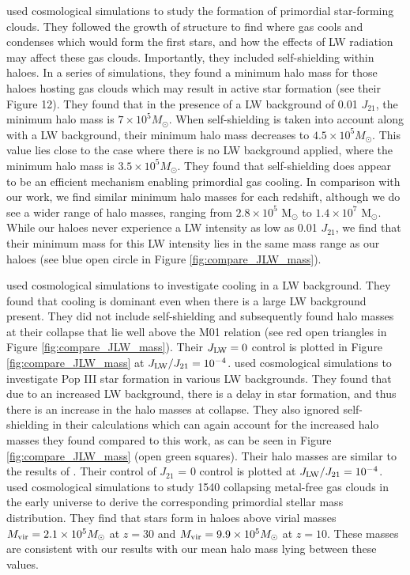 \documentclass[fleqn,usenatbib]{mnras}
\begin{document}
\citet{Yoshida03} used cosmological simulations to study the formation of primordial star-forming clouds. They followed the growth of structure to find where gas cools and condenses which would form the first stars, and how the effects of LW radiation may affect these gas clouds. Importantly, they included \hh{} self-shielding within haloes. In a series of simulations, they found a minimum halo mass for those haloes hosting gas clouds which may result in active star formation (see their Figure 12). They found that in the presence of a LW background of 0.01 $J_{21}$, the minimum halo mass is $7 \times 10^{5} M_{\odot}$. When \hh{} self-shielding is taken into account along with a LW background, their minimum halo mass decreases to $4.5 \times 10^{5} M_{\odot}$. This value lies close to the case where there is no LW background applied, where the minimum halo mass is $3.5 \times 10^{5} M_{\odot}$. They found that \hh{} self-shielding does appear to be an efficient mechanism enabling primordial gas cooling. In comparison with our work, we find similar minimum halo masses for each redshift, although we do see a wider range of halo masses, ranging from $2.8 \times 10^{5}$ M$_{\odot}$ to $1.4 \times 10^{7}$ M$_{\odot}$. While our haloes never experience a LW intensity as low as 0.01 $J_{21}$, we find that their minimum mass for this LW intensity lies in the same mass range as our haloes (see blue open circle in Figure \ref{fig:compare_JLW_mass}). 

\citet{Wise07_UVB} used cosmological simulations to investigate \hh{} cooling in a LW background. They found that \hh{} cooling is dominant even when there is a large LW background present. They did not include self-shielding and subsequently found halo masses at their collapse that lie well above the M01 relation (see red open triangles in Figure \ref{fig:compare_JLW_mass}). Their $J_{\rm LW} = 0$ control is plotted in Figure \ref{fig:compare_JLW_mass} at $J_{\rm LW}/J_{21} = 10^{-4}$. \citet{OShea08} used cosmological simulations to investigate Pop III star formation in various LW backgrounds. They found that due to an increased LW background, there is a delay in star formation, and thus there is an increase in the halo masses at collapse. They also ignored \hh{} self-shielding in their calculations which can again account for the increased halo masses they found compared to this work, as can be seen in Figure \ref{fig:compare_JLW_mass} (open green squares). Their halo masses are similar to the results of \citet{Wise07_UVB}. Their control of $J_{21}$ = 0 control is plotted at $J_{\rm LW}/J_{21} = 10^{-4}$. \citet{Hirano15} used cosmological simulations to study 1540 collapsing metal-free gas clouds in the early universe to derive the corresponding primordial stellar mass distribution. They find that stars form in haloes above virial masses $M_{\rm vir} = 2.1 \times 10^5 M_{\odot}$ at $z = 30$ and $M_{\rm vir} = 9.9 \times 10^5 M_{\odot}$ at $z = 10$. These masses are consistent with our results with our mean halo mass lying between these values.
\end{document}
